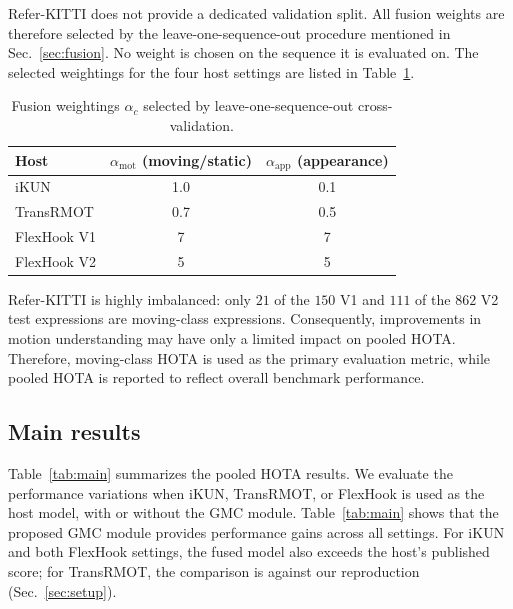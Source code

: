 \documentclass{article}
\begin{document}
Refer-KITTI does not provide a dedicated validation split. All fusion weights are therefore selected by the leave-one-sequence-out procedure mentioned in Sec.~\ref{sec:fusion}. No weight is chosen on the sequence it is evaluated on. The selected weightings for the four host settings are listed in Table~\ref{tab:alphas}.

\begin{table}[b]
  \centering
  \caption{Fusion weightings $\alpha_c$ selected by leave-one-sequence-out cross-validation.}
  \label{tab:alphas}
  \footnotesize
  \begin{tabular*}{\linewidth}{@{\extracolsep{\fill}}lcc}
    \hline
    Host        & $\alpha_{\mathrm{mot}}$ (moving/static) & $\alpha_{\mathrm{app}}$ (appearance) \\
    \hline
    iKUN        & 1.0 & 0.1 \\
    TransRMOT   & 0.7 & 0.5 \\
    FlexHook V1 & 7   & 7   \\
    FlexHook V2 & 5   & 5   \\
    \hline
  \end{tabular*}
\end{table}

Refer-KITTI is highly imbalanced: only $21$ of the $150$ V1 and $111$ of the $862$ V2 test expressions are moving-class expressions. Consequently, improvements in motion understanding may have only a limited impact on pooled HOTA. Therefore, moving-class HOTA is used as the primary evaluation metric, while pooled HOTA is reported to reflect overall benchmark performance.

\subsection{Main results}
\label{sec:main}
Table~\ref{tab:main} summarizes the pooled HOTA results. We evaluate the performance variations when iKUN, TransRMOT, or FlexHook is used as the host model, with or without the GMC module. Table~\ref{tab:main} shows that the proposed GMC module provides performance gains across all settings. For iKUN and both FlexHook settings, the fused model also exceeds the host's published score; for TransRMOT, the comparison is against our reproduction (Sec.~\ref{sec:setup}).
\end{document}
